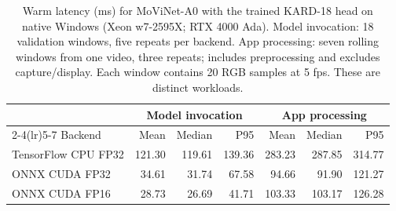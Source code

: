 \begin{table}[t]
\centering
\small
\caption{Warm latency (ms) for MoViNet-A0 with the trained KARD-18 head on native Windows (Xeon w7-2595X; RTX 4000 Ada). Model invocation: 18 validation windows, five repeats per backend. App processing: seven rolling windows from one video, three repeats; includes preprocessing and excludes capture/display. Each window contains 20 RGB samples at 5 fps. These are distinct workloads.}
\label{tab:movinet-kard-cuda}
\setlength{\tabcolsep}{4pt}
\begin{tabular}{lrrrrrr}
\toprule
 & \multicolumn{3}{c}{Model invocation} & \multicolumn{3}{c}{App processing} \\
\cmidrule(lr){2-4}\cmidrule(lr){5-7}
Backend & Mean & Median & P95 & Mean & Median & P95 \\
\midrule
TensorFlow CPU FP32 & 121.30 & 119.61 & 139.36 & 283.23 & 287.85 & 314.77 \\
ONNX CUDA FP32 & 34.61 & 31.74 & 67.58 & 94.66 & 91.90 & 121.27 \\
ONNX CUDA FP16 & 28.73 & 26.69 & 41.71 & 103.33 & 103.17 & 126.28 \\
\bottomrule
\end{tabular}
\end{table}
